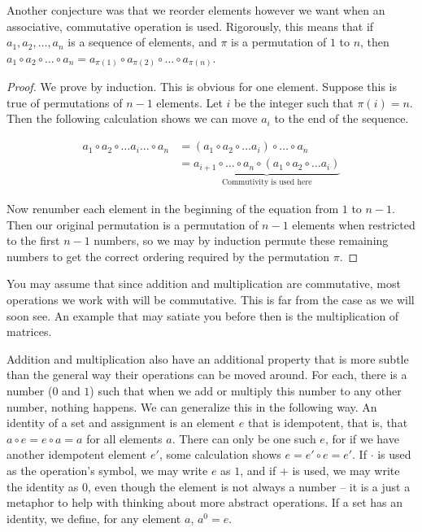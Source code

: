 \documentclass{report}
\begin{document}
Another conjecture was that we reorder elements however we want when an associative, commutative operation is used. Rigorously, this means that if $a_1, a_2, \dots, a_n$ is a sequence of elements, and $\pi$ is a permutation of $1$ to $n$, then $a_1\circ a_2 \circ \dots \circ a_n = a_{\pi(1)} \circ a_{\pi(2)} \circ \dots \circ a_{\pi(n)}$.
\begin{proof}
    We prove by induction. This is obvious for one element. Suppose this is true of permutations of $n-1$ elements. Let $i$ be the integer such that $\pi(i) = n$. Then the following calculation shows we can move $a_i$ to the end of the sequence.

    \begin{align*}
    a_1 \circ a_2 \circ \dots a_i \dots \circ a_n &= (a_1 \circ a_2 \circ \dots a_i) \circ \dots \circ a_n\\
    &= \underbrace{a_{i+1} \circ \dots \circ a_n \circ (a_1 \circ a_2 \circ \dots a_i)}_\text{Commutivity is used here}
    \end{align*}

    Now renumber each element in the beginning of the equation from $1$ to $n-1$. Then our original permutation is a permutation of $n-1$ elements when restricted to the first $n-1$ numbers, so we may by induction permute these remaining numbers to get the correct ordering required by the permutation $\pi$.
\end{proof}

You may assume that since addition and multiplication are commutative, most operations we work with will be commutative. This is far from the case as we will soon see. An example that may satiate you before then is the multiplication of matrices.

Addition and multiplication also have an additional property that is more subtle than the general way their operations can be moved around. For each, there is a number ($0$ and $1$) such that when we add or multiply this number to any other number, nothing happens. We can generalize this in the following way. An identity of a set and assignment is an element $e$ that is idempotent, that is, that $a \circ e = e \circ a = a$ for all elements $a$. There can only be one such $e$, for if we have another idempotent element $e'$, some calculation shows $e = e' \circ e = e'$. If $\cdotp$ is used as the operation's symbol, we may write $e$ as $1$, and if $+$ is used, we may write the identity as $0$, even though the element is not always a number -- it is a just a metaphor to help with thinking about more abstract operations. If a set has an identity, we define, for any element $a$, $a^0 = e$.
\end{document}
